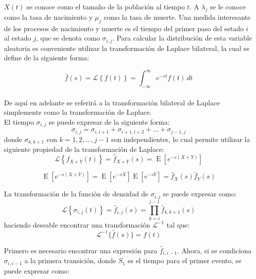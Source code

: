 \documentclass[11pt]{article}
\numberwithin{equation}{section} %
\begin{document}
$X(t)$ se conoce como el tamaño de la población al tiempo $t$. A $\lambda_j$ se le conoce como la tasa de nacimiento y $\mu_j$ como la tasa de muerte. Una medida interesante de los procesos de nacimiento y muerte es el tiempo del primer paso del estado $i$ al estado $j$, que se denota como $\sigma_{i,j}$. Para calcular la distribución de esta variable aleatoria es conveniente utilizar la transformación de Laplace bilateral, la cual se define de la siguiente forma:

\begin{equation}
\hat{f}(s) = \mathcal{L} \left\{f(t)\right\}=\int_{-\infty}^{\infty} e^{-st} f(t) \,dt
\end{equation}\\

De aquí en adelante se referirá a la transformación bilateral de Laplace simplemente como la transformación de Laplace.\\

El tiempo $\sigma_{i,j}$ se puede expresar de la siguiente forma:
\begin{equation}
\sigma_{i,j}=\sigma_{i,i+1}+\sigma_{i+1,i+2}+\ldots+\sigma_{j-1,j}
\end{equation}
donde $\sigma_{k,k+1}$ con $k=1,2,\ldots,j-1$ son independientes, lo cual permite utilizar la siguiente propiedad de la transformación de Laplace:
\begin{equation}
\mathcal{L} \left\{f_{X+Y}(t)\right\}=\hat{f}_{X+Y}(s)=\operatorname{E}[e^{-s(X+Y)}]
\end{equation}

\begin{equation}
\operatorname{E}[e^{-s(X+Y)}]=\operatorname{E}[e^{-sX}]\operatorname{E}[e^{-sY}]=\hat{f}_{X}(s)\hat{f}_{Y}(s)
\end{equation}

La transformación de la función de densidad de $\sigma_{i,j}$ se puede expresar como:
\begin{equation} \label{eq:laplacesum}
\mathcal{L} \left\{\sigma_{i,j}(t)\right\}=\hat{f}_{i,j}(s)=\prod_{k=i}^{j-1}\hat{f}_{k,k+1}(s)
\end{equation}
haciendo deseable encontrar una transformación $\mathcal{L}^{-1}$ tal que:
\begin{equation}
\mathcal{L}^{-1}\{\hat{f}(s)\}=f(t)
\end{equation}

Primero es necesario encontrar una expresión para $\hat{f}_{i,i-1}$. Ahora, si se condiciona $\sigma_{i,i-1}$ a la primera transición, donde $S_1$ es el tiempo para el primer evento, se puede expresar como:
\end{document}
